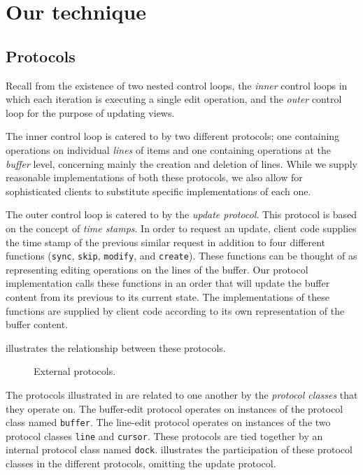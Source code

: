 \section{Our technique}
\label{sec-our-technique}

\subsection{Protocols}

Recall from  the existence of two nested
control loops, the \emph{inner} control loops in which each iteration
is executing a single edit operation, and the \emph{outer} control
loop for the purpose of updating views.

The inner control loop is catered to by two different protocols; one
containing operations on individual \emph{lines} of items and one
containing operations at the \emph{buffer} level, concerning mainly
the creation and deletion of lines.  While we supply reasonable
implementations of both these protocols, we also allow for
sophisticated clients to substitute specific implementations of each
one.

The outer control loop is catered to by the \emph{update protocol}.
This protocol is based on the concept of \emph{time stamps}.  In order
to request an update, client code supplies the time stamp of the
previous similar request in addition to four different functions
(\texttt{sync}, \texttt{skip}, \texttt{modify}, and \texttt{create}).
These functions can be thought of as representing editing operations
on the lines of the buffer.  Our protocol implementation calls these
functions in an order that will update the buffer content from its
previous to its current state.  The implementations of these functions
are supplied by client code according to its own representation of the
buffer content.

 illustrates the relationship between
these protocols.

\begin{figure}
\begin{center}
\end{center}
\caption{\label{fig-external-protocols}
External protocols.}
\end{figure}

The protocols illustrated in  are
related to one another by the \emph{protocol classes} that they
operate on.  The buffer-edit protocol operates on instances of the
protocol class named \texttt{buffer}.  The line-edit protocol operates
on instances of the two protocol classes \texttt{line} and
\texttt{cursor}.  These protocols are tied together by an internal
protocol class named \texttt{dock}.  
illustrates the participation of these protocol classes in the
different protocols, omitting the update protocol.


